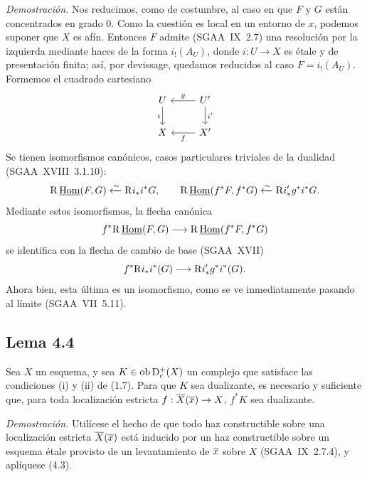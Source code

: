 \emph{Demostración.} Nos reducimos, como de costumbre, al caso en que $F$ y $G$ están concentrados en grado $0$. Como la cuestión es local en un entorno de $x$, podemos suponer que $X$ es afín. Entonces $F$ admite (SGAA~IX~2.7) una resolución por la izquierda mediante haces de la forma $i_!(A_U)$, donde $i : U \to X$ es étale y de presentación finita; así, por devissage, quedamos reducidos al caso $F = i_!(A_U)$. Formemos el cuadrado cartesiano
\[
\begin{tikzcd}
U \arrow[d,"i"'] & U' \arrow[l,"g"'] \arrow[d,"i'"] \\
X & X' \arrow[l,"f"]
\end{tikzcd}
\]
Se tienen isomorfismos canónicos, casos particulares triviales de la dualidad (SGAA~XVIII~3.1.10):
\[
\mathrm{R}\,\underline{\operatorname{Hom}}(F,G)\xleftarrow{\sim}\mathrm{R} i_* i^*G,
\qquad
\mathrm{R}\,\underline{\operatorname{Hom}}(f^*F,f^*G)\xleftarrow{\sim}\mathrm{R} i'_* g^*i^*G.
\]
Mediante estos isomorfismos, la flecha canónica
\[
f^*\mathrm{R}\,\underline{\operatorname{Hom}}(F,G)\longrightarrow \mathrm{R}\,\underline{\operatorname{Hom}}(f^*F,f^*G)
\]
se identifica con la flecha de cambio de base (SGAA~XVII)
\[
f^*\mathrm{R} i_*i^*(G)\longrightarrow \mathrm{R} i'_*g^*i^*(G).
\]
Ahora bien, esta última es un isomorfismo, como se ve inmediatamente pasando al límite (SGAA~VII~5.11).

\subsection*{Lema 4.4}
Sea $X$ un esquema, y sea $K \in \operatorname{ob} \mathrm{D}_c^+(X)$ un complejo que satisface las condiciones (i) y (ii) de (1.7). Para que $K$ sea dualizante, es necesario y suficiente que, para toda localización estricta $f : \overline{X}(\overline{x}) \to X$, $f^*K$ sea dualizante.

\emph{Demostración.} Utilícese el hecho de que todo haz constructible sobre una localización estricta $\overline{X}(\overline{x})$ está inducido por un haz constructible sobre un esquema étale provisto de un levantamiento de $\overline{x}$ sobre $X$ (SGAA~IX~2.7.4), y aplíquese (4.3).
